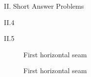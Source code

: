 \documentclass[a4paper,12pt]{article}
\begin{document}
\begin{section}{II. Short Answer Problems}
\begin{subsection}{II.4}
\end{subsection}

\clearpage
\begin{subsection}{II.5}


\begin{figure}[!htb]
        \caption{First horizontal seam}
      \end{figure}
      \clearpage
      
      \begin{figure}[!htb]
        \caption{First horizontal seam}
      \end{figure}
\clearpage


\end{subsection}
\end{section}
\end{document}
